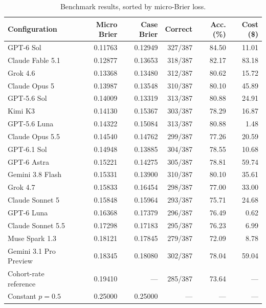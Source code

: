 \documentclass[11pt]{article}
\begin{document}
\begin{table}[tb]
\centering\small
\setlength{\tabcolsep}{4pt}
\begin{tabular}{lrrrrr}\toprule
Configuration & Micro Brier & Case Brier & Correct & Acc. (\%) & Cost (\$)\\\midrule
GPT-6 Sol & 0.11763 & 0.12949 & 327/387 & 84.50 & 11.01 \\
Claude Fable 5.1 & 0.12877 & 0.13653 & 318/387 & 82.17 & 83.18 \\
Grok 4.6 & 0.13368 & 0.13480 & 312/387 & 80.62 & 15.72 \\
Claude Opus 5 & 0.13987 & 0.13548 & 310/387 & 80.10 & 45.89 \\
GPT-5.6 Sol & 0.14009 & 0.13319 & 313/387 & 80.88 & 24.91 \\
Kimi K3 & 0.14130 & 0.15367 & 303/387 & 78.29 & 16.87 \\
GPT-5.6 Luna & 0.14322 & 0.15084 & 313/387 & 80.88 & 1.48 \\
Claude Opus 5.5 & 0.14540 & 0.14762 & 299/387 & 77.26 & 20.59 \\
GPT-6.1 Sol & 0.14948 & 0.13885 & 304/387 & 78.55 & 10.68 \\
GPT-6 Astra & 0.15221 & 0.14275 & 305/387 & 78.81 & 59.74 \\
Gemini 3.8 Flash & 0.15331 & 0.13900 & 310/387 & 80.10 & 35.61 \\
Grok 4.7 & 0.15833 & 0.16454 & 298/387 & 77.00 & 33.00 \\
Claude Sonnet 5 & 0.15848 & 0.15964 & 293/387 & 75.71 & 24.68 \\
GPT-6 Luna & 0.16368 & 0.17379 & 296/387 & 76.49 & 0.62 \\
Claude Sonnet 5.5 & 0.17298 & 0.17183 & 295/387 & 76.23 & 6.99 \\
Muse Spark 1.3 & 0.18121 & 0.17845 & 279/387 & 72.09 & 8.78 \\
Gemini 3.1 Pro Preview & 0.18345 & 0.18080 & 302/387 & 78.04 & 59.04 \\
\midrule
Cohort-rate reference & 0.19410 & --- & 285/387 & 73.64 & ---\\
Constant $p=0.5$ & 0.25000 & 0.25000 & --- & --- & ---\\
\bottomrule\end{tabular}
\caption{Benchmark results, sorted by micro-Brier loss.}
\label{tab:main}
\end{table}
\end{document}
